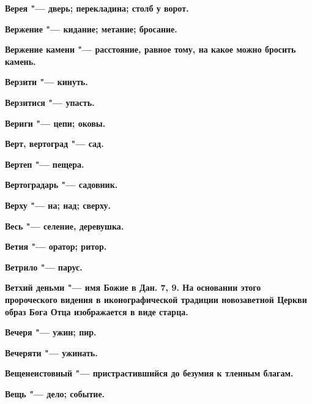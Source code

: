 \bfseries Верея \normalfont{} "--- дверь; перекладина; столб у ворот. 




\bfseries Вержение \normalfont{} "--- кидание; метание; бросание. 




\bfseries Вержение камени \normalfont{} "--- расстояние, равное тому, на какое можно бросить камень. 




\bfseries Верзити \normalfont{} "--- кинуть. 




\bfseries Верзитися \normalfont{} "--- упасть. 




\bfseries Вериги \normalfont{} "--- цепи; оковы. 




\bfseries Верт, вертоград \normalfont{} "--- сад. 




\bfseries Вертеп \normalfont{} "--- пещера. 




\bfseries Вертоградарь \normalfont{} "--- садовник. 




\bfseries Верху \normalfont{} "--- на; над; сверху. 




\bfseries Весь \normalfont{} "--- селение, деревушка. 




\bfseries Ветия \normalfont{} "--- оратор; ритор. 




\bfseries Ветрило \normalfont{} "--- парус. 




\bfseries Ветхий деньми \normalfont{} "--- имя Божие в Дан. 7, 9. На основании этого пророческого видения в иконографической традиции новозаветной Церкви образ Бога Отца изображается в виде старца. 




\bfseries Вечеря \normalfont{} "--- ужин; пир. 




\bfseries Вечеряти \normalfont{} "--- ужинать. 




\bfseries Вещенеистовный \normalfont{} "--- пристрастившийся до безумия к тленным благам. 




\bfseries Вещь \normalfont{} "--- дело; событие. 




